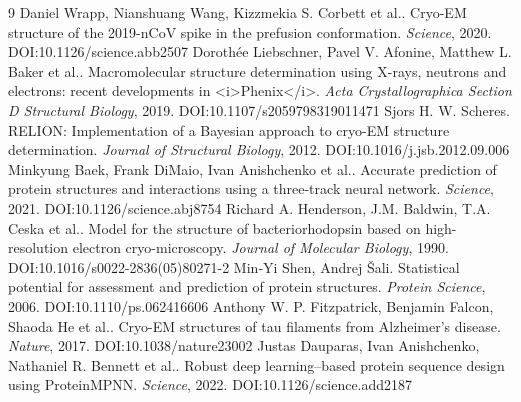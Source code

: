 \documentclass[11pt]{article}
\begin{document}
\begin{thebibliography}{9}
 Daniel Wrapp, Nianshuang Wang, Kizzmekia S. Corbett et al.. Cryo-EM structure of the 2019-nCoV spike in the prefusion conformation. \emph{Science}, 2020. DOI:10.1126/science.abb2507
 Dorothée Liebschner, Pavel V. Afonine, Matthew L. Baker et al.. Macromolecular structure determination using X-rays, neutrons and electrons: recent developments in <i>Phenix</i>. \emph{Acta Crystallographica Section D Structural Biology}, 2019. DOI:10.1107/s2059798319011471
 Sjors H. W. Scheres. RELION: Implementation of a Bayesian approach to cryo-EM structure determination. \emph{Journal of Structural Biology}, 2012. DOI:10.1016/j.jsb.2012.09.006
 Minkyung Baek, Frank DiMaio, Ivan Anishchenko et al.. Accurate prediction of protein structures and interactions using a three-track neural network. \emph{Science}, 2021. DOI:10.1126/science.abj8754
 Richard A. Henderson, J.M. Baldwin, T.A. Ceska et al.. Model for the structure of bacteriorhodopsin based on high-resolution electron cryo-microscopy. \emph{Journal of Molecular Biology}, 1990. DOI:10.1016/s0022-2836(05)80271-2
 Min‐Yi Shen, Andrej Šali. Statistical potential for assessment and prediction of protein structures. \emph{Protein Science}, 2006. DOI:10.1110/ps.062416606
 Anthony W. P. Fitzpatrick, Benjamin Falcon, Shaoda He et al.. Cryo-EM structures of tau filaments from Alzheimer’s disease. \emph{Nature}, 2017. DOI:10.1038/nature23002
 Justas Dauparas, Ivan Anishchenko, Nathaniel R. Bennett et al.. Robust deep learning–based protein sequence design using ProteinMPNN. \emph{Science}, 2022. DOI:10.1126/science.add2187
\end{thebibliography}
\end{document}
